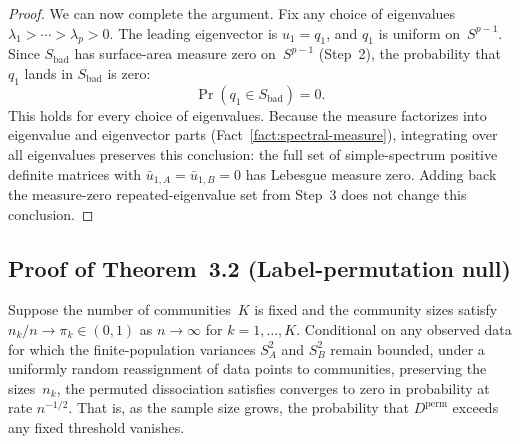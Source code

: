 \documentclass[hidelinks]{siamart251216}
\newcommand{\settheoremnum}[1]{\renewcommand{\thetheorem}{#1}}
\begin{document}
\begin{proof}
  We can now complete the argument.  Fix any choice of eigenvalues
  $\lambda_1 > \cdots > \lambda_p > 0$.  The leading eigenvector is
  $u_1 = q_1$, and $q_1$ is uniform on~$S^{p-1}$.  Since
  $S_{\mathrm{bad}}$ has surface-area measure zero on~$S^{p-1}$
  (Step~2), the probability that $q_1$ lands in $S_{\mathrm{bad}}$ is
  zero:
  \[
    \Pr(q_1 \in S_{\mathrm{bad}}) = 0.
  \]
  This holds for every choice of eigenvalues.  Because the measure
  factorizes into eigenvalue and eigenvector parts
  (Fact~\ref{fact:spectral-measure}), integrating over all eigenvalues
  preserves this conclusion: the full set of simple-spectrum positive
  definite matrices with $\bar{u}_{1,A} = \bar{u}_{1,B} = 0$ has
  Lebesgue measure zero.  Adding back the measure-zero
  repeated-eigenvalue set from Step~3 does not change this conclusion.
\end{proof}


\subsection{Proof of Theorem~3.2 (Label-permutation null)}

\settheoremnum{3.2}
\begin{theorem}
  Suppose the number of communities~$K$ is fixed and the community
  sizes satisfy $n_k / n \to \pi_k \in (0,1)$ as $n \to \infty$ for
  $k = 1, \ldots, K$.  Conditional on any observed data for which the
  finite-population variances $S_A^2$ and $S_B^2$ remain bounded, under
  a uniformly random reassignment of data points to communities,
  preserving the sizes~$n_k$, the permuted dissociation satisfies
  converges to zero in probability at rate $n^{-1/2}$.
  That is, as the sample size grows, the probability that
  $D^{\mathrm{perm}}$ exceeds any fixed threshold vanishes.
\end{theorem}
\end{document}

